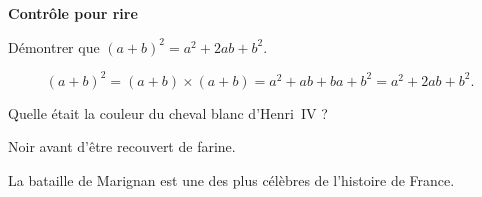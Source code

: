 \documentclass[12pt,%
addpoints,%
]{exam}
\begin{document}
\begin{center}
  {\huge\bfseries\sffamily Contrôle pour rire}
  \par\bigskip
  \gradetable[h]
\end{center}
\begin{questions}
  \question[1\half] Démontrer que \( (a+b)^2 = a^2 + 2ab + b^2 \).
  \begin{solution}[5\bigskipamount]
    \[
      (a+b)^2 = (a+b)\times(a+b) = a^2 + ab + ba + b^2 = a^2 + 2ab + b^2.
    \]
  \end{solution}
  \question[1\half] Quelle était la couleur du cheval blanc d'Henri~IV ?
  \begin{solution}[3\bigskipamount]
    Noir avant d'être recouvert de farine.
  \end{solution}
  
  \question[2] La bataille de Marignan est une des plus célèbres de l'histoire de France.
  
\end{questions}
\end{document}
